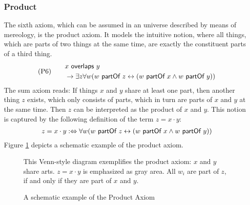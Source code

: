 \subsubsection{Product}
The sixth axiom, which can be assumed in an universe described by means of mereology, is the product axiom.
It models the intuitive notion, where all things, which are parts of two things at the same time, are exactly the constituent parts of a third thing.
\begin{align}
&\text{(P6)}
\quad
&\begin{split}
&x ~\textsf{overlaps}~ y 
\\&\rightarrow
\exists z \forall w (w ~\textsf{partOf}~ z \leftrightarrow (w ~\textsf{partOf}~ x \wedge w ~\textsf{partOf}~ y))
\end{split}
\label{axiom:Product}
\end{align}
The sum axiom reads:
If things $x$ and $y$ share at least one part, then another thing $z$ exists, which only consists of parts, which in turn are parts of $x$ and $y$ at the same time.
Then $z$ can be interpreted as the product of $x$ and $y$.
This notion is captured by the following definition of the term $z = x \cdot y$:
\begin{align}
z = x \cdot y
:\Leftrightarrow
\forall w (w ~\textsf{partOf}~ z \leftrightarrow (w ~\textsf{partOf}~ x \wedge w ~\textsf{partOf}~ y))
\label{definition:Product}
\end{align}
Figure \ref{figure:ProductAxiomExample} depicts a schematic example of the product axiom.

\begin{figure}[h!]
\begin{center}
\end{center}
{
\scriptsize 
This Venn-style diagram exemplifies the product axiom:
$x$ and $y$ share arts.
$z = x \cdot y$ is emphasized as gray area.
All $w_i$ are part of $z$, if and only if they are part of $x$ and $y$.
}
\caption{A schematic example of the Product Axiom}
\label{figure:ProductAxiomExample}
\end{figure}

